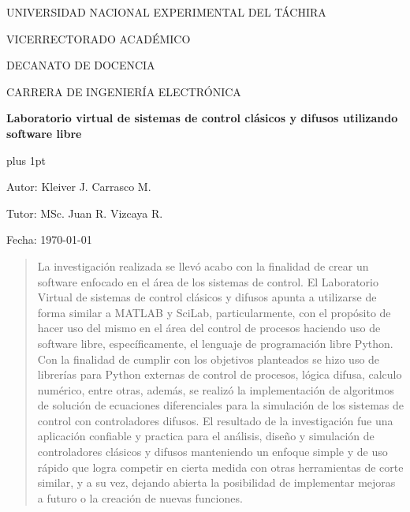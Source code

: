 \begin{center}
	\begin{spacing}{1}
		UNIVERSIDAD NACIONAL EXPERIMENTAL DEL TÁCHIRA
		
		VICERRECTORADO ACADÉMICO
		
		DECANATO DE DOCENCIA
		
		CARRERA DE INGENIERÍA ELECTRÓNICA
	
		\vspace{35pt}

		{\large \textbf{Laboratorio virtual de sistemas de control clásicos y difusos utilizando software libre}\par}
	
	\end{spacing}
\end{center}

\vspace{25pt}

\begin{flushright}
	\begin{spacing}{1}
		\parskip=0pt plus 1pt

		Autor: Kleiver J. Carrasco M.

		Tutor: MSc. Juan R. Vizcaya R.

		Fecha: \monthyearFecha\today
		
	\end{spacing}	
\end{flushright}

\vspace{15pt}

\begin{abstract}
	La investigación realizada se llevó acabo con la finalidad de crear un software enfocado en el área de los sistemas de control. El Laboratorio Virtual de sistemas de control clásicos y difusos apunta a utilizarse de forma similar a MATLAB y SciLab, particularmente, con el propósito de hacer uso del mismo en el área del control de procesos haciendo uso de software libre, específicamente, el lenguaje de programación libre Python. Con la finalidad de cumplir con los objetivos planteados se hizo uso de librerías para Python externas de control de procesos, lógica difusa, calculo numérico, entre otras, además, se realizó la implementación de algoritmos de solución de ecuaciones diferenciales para la simulación de los sistemas de control con controladores difusos. El resultado de la investigación fue una aplicación confiable y practica para el análisis, diseño y simulación de controladores clásicos y difusos manteniendo un enfoque simple y de uso rápido que logra competir en cierta medida con otras herramientas de corte similar, y a su vez, dejando abierta la posibilidad de implementar mejoras a futuro o la creación de nuevas funciones.
\end{abstract}

